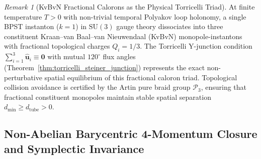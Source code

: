 \documentclass[11pt,a4paper,reqno]{article}
\theoremstyle{plain}
\theoremstyle{definition}
\theoremstyle{remark}
\newtheorem{remark}[theorem]{Remark}
\numberwithin{equation}{section}
\begin{document}
\begin{remark}[KvBvN Fractional Calorons as the Physical Torricelli Triad]
\label{rem:kvbvn_torricelli_triad}
At finite temperature $T > 0$ with non-trivial temporal Polyakov loop holonomy, a single BPST instanton ($k = 1$) in $\mathrm{SU}(3)$ gauge theory dissociates into three constituent Kraan--van Baal--van Nieuwendaal (KvBvN) monopole-instantons with fractional topological charges $Q_i = 1/3$. 
The Torricelli Y-junction condition $\sum_{i=1}^3 \hat{\mathbf{u}}_i \equiv \mathbf{0}$ with mutual $120^\circ$ flux angles (Theorem~\ref{thm:torricelli_steiner_junction}) represents the exact non-perturbative spatial equilibrium of this fractional caloron triad. Topological collision avoidance is certified by the Artin pure braid group $\mathcal{P}_3$, ensuring that fractional constituent monopoles maintain stable spatial separation $d_{\min} \ge d_{\mathrm{tube}} > 0$.
\end{remark}

\subsection{Non-Abelian Barycentric 4-Momentum Closure and Symplectic Invariance}
\label{subsec:ym_barycentric_closure}
\end{document}

